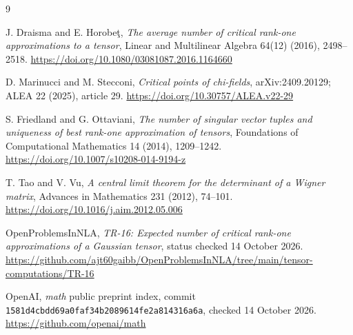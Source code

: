 \documentclass[11pt]{article}
\begin{document}
\begin{thebibliography}{9}
\small\raggedright
{}\hypertarget{ref1}{}J. Draisma and E. Horobe\c{t}, \emph{The average number of critical rank-one approximations to a tensor}, Linear and Multilinear Algebra 64(12) (2016), 2498--2518. \url{https://doi.org/10.1080/03081087.2016.1164660}

\hypertarget{ref2}{}D. Marinucci and M. Stecconi, \emph{Critical points of chi-fields}, arXiv:2409.20129; ALEA 22 (2025), article 29. \url{https://doi.org/10.30757/ALEA.v22-29}

\hypertarget{ref3}{}S. Friedland and G. Ottaviani, \emph{The number of singular vector tuples and uniqueness of best rank-one approximation of tensors}, Foundations of Computational Mathematics 14 (2014), 1209--1242. \url{https://doi.org/10.1007/s10208-014-9194-z}

\hypertarget{ref4}{}T. Tao and V. Vu, \emph{A central limit theorem for the determinant of a Wigner matrix}, Advances in Mathematics 231 (2012), 74--101. \url{https://doi.org/10.1016/j.aim.2012.05.006}

\hypertarget{ref5}{}OpenProblemsInNLA, \emph{TR-16: Expected number of critical rank-one approximations of a Gaussian tensor}, status checked 14 October 2026. \url{https://github.com/ajt60gaibb/OpenProblemsInNLA/tree/main/tensor-computations/TR-16}

\hypertarget{ref6}{}OpenAI, \emph{math} public preprint index, commit \texttt{1581d4cbdd69a0faf34b2089614fe2a814316a6a}, checked 14 October 2026. \url{https://github.com/openai/math}

\end{thebibliography}
\end{document}
